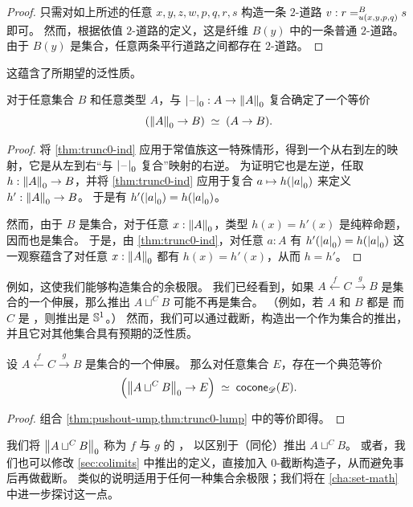 \begin{proof}
  只需对如上所述的任意 $x,y,z,w,p,q,r,s$ 构造一条 $2$-道路 $v:\dpath{B}{u(x,y,p,q)}{r}{s}$ 即可。
  然而，根据依值 $2$-道路的定义，这是纤维 $B(y)$ 中的一条普通 $2$-道路。
  由于 $B(y)$ 是集合，任意两条平行道路之间都存在 $2$-道路。
\end{proof}

这蕴含了所期望的泛性质。

\begin{lem}\label{thm:trunc0-lump}
  对于任意集合 $B$ 和任意类型 $A$，与 $\tprojf0:A\to \trunc0A$ 复合确定了一个等价
  \[ \eqvspaced{(\trunc0A\to B)}{(A\to B)}. \]
\end{lem}

\begin{proof}
  将 \cref{thm:trunc0-ind} 应用于常值族这一特殊情形，得到一个从右到左的映射，它是从左到右``与 $\tprojf0$ 复合''映射的右逆。
  为证明它也是左逆，任取 $h:\trunc0A\to B$，并将 \cref{thm:trunc0-ind} 应用于复合 $a\mapsto h(\tproj0a)$ 来定义 $h':\trunc0A\to B$。
  于是有 $h'(\tproj0a)=h(\tproj0a)$。

  然而，由于 $B$ 是集合，对于任意 $x:\trunc0A$，类型 $h(x)=h'(x)$ 是纯粹命题，因而也是集合。
  于是，由 \cref{thm:trunc0-ind}，对任意 $a:A$ 有 $h'(\tproj0a)=h(\tproj0a)$ 这一观察蕴含了对任意 $x:\trunc0A$ 都有 $h(x)=h'(x)$，从而 $h=h'$。
\end{proof}

%
%
例如，这使我们能够构造集合的余极限。
我们已经看到，如果 $A \xleftarrow{f} C \xrightarrow{g} B$ 是集合的一个伸展，那么推出 $A\sqcup^C B$ 可能不再是集合。
（例如，若 $A$ 和 $B$ 都是 \unit 而 $C$ 是 \bool，则推出是 $\Sn^1$。）
然而，我们可以通过截断，构造出一个作为集合的推出，并且它对其他集合具有预期的泛性质。

\begin{lem}\label{thm:set-pushout}
  设 $A \xleftarrow{f} C \xrightarrow{g} B$ 是集合的一个伸展。
  那么对任意集合 $E$，存在一个典范等价
  \[ \Parens{\trunc0{A\sqcup^C B} \to E} \;\eqvsym\; \cocone{\Ddiag}{E}. \]
\end{lem}

\begin{proof}
  组合 \cref{thm:pushout-ump,thm:trunc0-lump} 中的等价即得。
\end{proof}

我们将 $\trunc0{A\sqcup^C B}$ 称为 $f$ 与 $g$ 的 
%
，
以区别于（同伦）推出 $A\sqcup^C B$。
或者，我们也可以修改 \cref{sec:colimits} 中推出的定义，直接加入 $0$-截断构造子，从而避免事后再做截断。
类似的说明适用于任何一种集合余极限；我们将在 \cref{cha:set-math} 中进一步探讨这一点。

